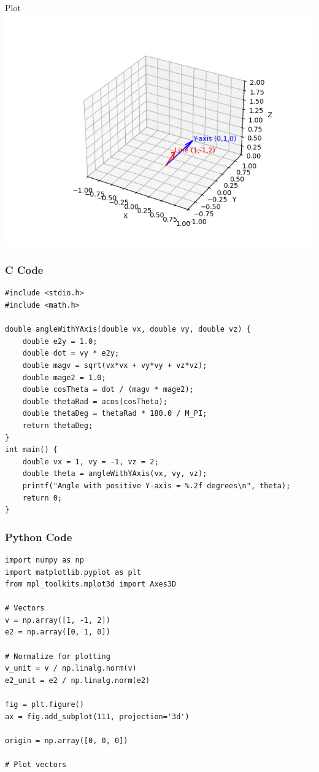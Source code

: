 \documentclass{beamer}
\begin{document}
\begin{frame}{Plot}
\centering
\includegraphics[height=0.6\textheight, keepaspectratio]{figs/q3.png}
\end{frame}

\begin{frame}[fragile]
    \frametitle{C Code}
\begin{lstlisting}
#include <stdio.h>
#include <math.h>

double angleWithYAxis(double vx, double vy, double vz) {
    double e2y = 1.0;
    double dot = vy * e2y;
    double magv = sqrt(vx*vx + vy*vy + vz*vz);
    double mage2 = 1.0;
    double cosTheta = dot / (magv * mage2);
    double thetaRad = acos(cosTheta);
    double thetaDeg = thetaRad * 180.0 / M_PI;
    return thetaDeg;
}
int main() {
    double vx = 1, vy = -1, vz = 2;
    double theta = angleWithYAxis(vx, vy, vz);
    printf("Angle with positive Y-axis = %.2f degrees\n", theta);
    return 0;
}
\end{lstlisting}
\end{frame}

\begin{frame}[fragile]
    \frametitle{Python Code}
\begin{lstlisting}
import numpy as np
import matplotlib.pyplot as plt
from mpl_toolkits.mplot3d import Axes3D

# Vectors
v = np.array([1, -1, 2])
e2 = np.array([0, 1, 0])

# Normalize for plotting
v_unit = v / np.linalg.norm(v)
e2_unit = e2 / np.linalg.norm(e2)

fig = plt.figure()
ax = fig.add_subplot(111, projection='3d')

origin = np.array([0, 0, 0])

# Plot vectors
\end{lstlisting}
\end{frame}
\end{document}
